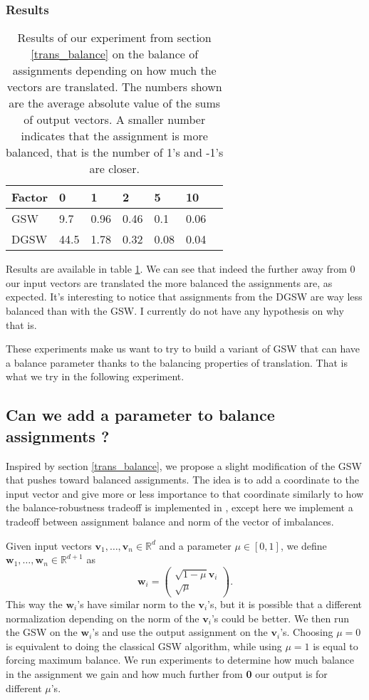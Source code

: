 \documentclass[12pt]{article}
\begin{document}
\subsubsection{Results}
\begin{table}[h!]
\centering
\caption{Results of our experiment from section \ref{trans_balance} on the balance of assignments depending on how much the vectors are translated. The numbers shown are the average absolute value of the sums of output vectors. A smaller number indicates that the assignment is more balanced, that is the number of 1's and -1's are closer.}
\begin{tabular}{l|llllll}
 Factor & 0 & 1  & 2 & 5 & 10  \\
\hline
GSW  & 9.7 & 0.96 & 0.46 & 0.1 & 0.06 \\
DGSW & 44.5 & 1.78 & 0.32 & 0.08 & 0.04
\end{tabular}
\label{balance_when_translated}\end{table}
Results are available in table \ref{balance_when_translated}. We can see that indeed the further away from 0 our input vectors are translated the more balanced the assignments are, as expected. It's interesting to notice that assignments from the DGSW are way less balanced than with the GSW. I currently do not have any hypothesis on why that is.

These experiments make us want to try to build a variant of GSW that can have a balance parameter thanks to the balancing properties of translation. That is what we try in the following experiment.

\subsection{Can we add a parameter to balance assignments ?}\label{balance_parameter}
Inspired by section \ref{trans_balance}, we propose a slight modification of the GSW that pushes toward balanced assignments. The idea is to add a coordinate to the input vector and give more or less importance to that coordinate similarly to how the balance-robustness tradeoff is implemented in \cite{harshaw2019balancing}, except here we implement a tradeoff between assignment balance and norm of the vector of imbalances.

Given input vectors $\textbf{v}_1,\dots,\textbf{v}_n\in\mathbb{R}^d$ and a parameter $\mu\in[0,1]$, we define $\textbf{w}_1,\dots,\textbf{w}_n\in\mathbb{R}^{d+1}$ as $$\textbf{w}_i=\begin{pmatrix}\sqrt{1-\mu}\textbf{v}_i \\ \sqrt{\mu}\end{pmatrix}.$$ This way the $\textbf{w}_i$'s have similar norm to the $\textbf{v}_i$'s, but it is possible that a different normalization depending on the norm of the $\textbf{v}_i$'s could be better. We then run the GSW on the $\textbf{w}_i$'s and use the output assignment on the $\textbf{v}_i$'s. Choosing $\mu=0$ is equivalent to doing the classical GSW algorithm, while using $\mu=1$ is equal to forcing maximum balance. We run experiments to determine how much balance in the assignment we gain and how much further from \textbf{0} our output is for different $\mu$'s.
\end{document}
